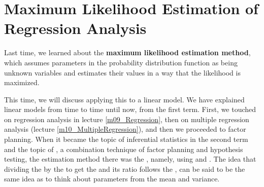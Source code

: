 \documentclass{ltjbook}
\begin{document}
\chapter{Maximum Likelihood Estimation of Regression Analysis}
\label{m24_maximum_likelihood}
Last time, we learned about the \textbf{maximum likelihood estimation method}, which assumes parameters in the probability distribution function as being unknown variables and estimates their values in a way that the likelihood is maximized.

This time, we will discuss applying this to a linear model. We have explained linear models from time to time until now, from the first term. First, we touched on regression analysis in lecture \ref{m09_Regression}, then on multiple regression analysis (lecture \ref{m10_MultipleRegression}), and then we proceeded to factor planning. When it became the topic of inferential statistics in the second term and the topic of , a combination technique of factor planning and hypothesis testing, the estimation method there was the , namely, using  and . The idea that dividing the  by the  to get the  and its ratio follows the , can be said to be the same idea as to think about parameters from the mean and variance.
\end{document}
